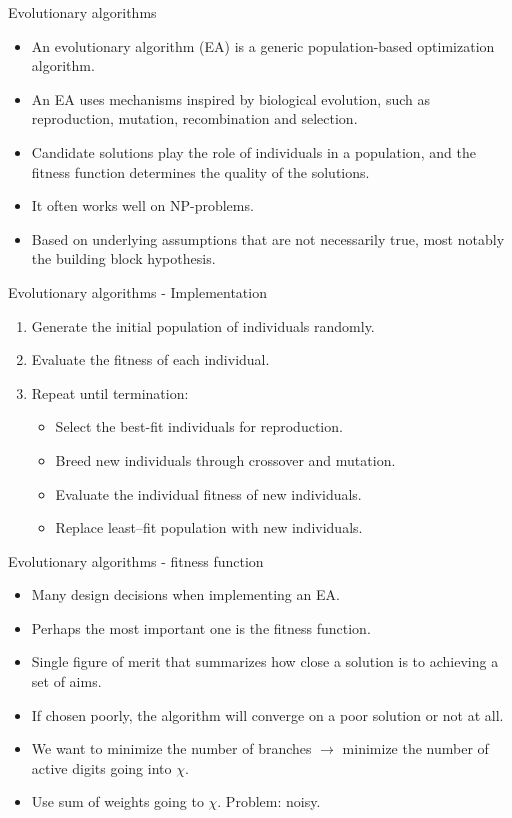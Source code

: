 \documentclass{beamer}
\begin{document}
\begin{frame}{Evolutionary algorithms}
\begin{itemize}
    \item An evolutionary algorithm (EA) is a generic population-based optimization algorithm.
    \item An EA uses mechanisms inspired by biological evolution, such as reproduction, mutation, recombination and selection.
    \item Candidate solutions play the role of individuals in a population, and the fitness function determines the quality of the solutions.
    \item It often works well on NP-problems.
    \item Based on underlying assumptions that are not necessarily true, most notably the building block hypothesis.
\end{itemize}
\end{frame}

\begin{frame}{Evolutionary algorithms - Implementation}
\begin{enumerate}
    \item Generate the initial population of individuals randomly.
    \item Evaluate the fitness of each individual.
    \item Repeat until termination:
    \begin{itemize}
        \item Select the best-fit individuals for reproduction.
        \item Breed new individuals through crossover and mutation.
        \item Evaluate the individual fitness of new individuals.
        \item Replace least--fit population with new individuals.
    \end{itemize}
\end{enumerate}
\end{frame}

\begin{frame}{Evolutionary algorithms - fitness function}
\begin{itemize}
    \item Many design decisions when implementing an EA.
    \item Perhaps the most important one is the fitness function.
    \item Single figure of merit that summarizes how close a solution is to achieving a set of aims.
    \item If chosen poorly, the algorithm will converge on a poor solution or not at all.
    \item We want to minimize the number of branches $\rightarrow$ minimize the number of active digits going into $\chi$.
    \item Use sum of weights going to $\chi$. Problem: noisy.
\end{itemize}
\end{frame}
\end{document}

